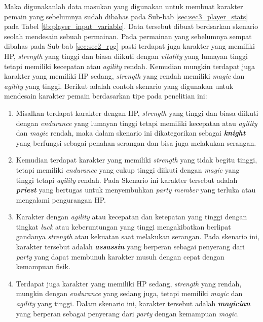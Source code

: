 Maka digunakanlah data masukan yang digunakan untuk membuat karakter pemain yang sebelumnya sudah dibahas pada Sub-bab \ref{sec:sec3_player_stats} pada Tabel \ref{tb:player_input_variable}. Data tersebut dibuat berdsarkan skenario seolah mendesain sebuah permainan. Pada permainan yang sebelumnya sempat dibahas pada Sub-bab \ref{sec:sec2_rpg} pasti terdapat juga karakter yang memiliki HP, \textit{strength} yang tinggi dan biasa diikuti dengan \textit{vitality} yang lumayan tinggi tetapi memiliki kecepatan atau \textit{agility} rendah. Kemudian mungkin terdapat juga karakter yang memiliki HP sedang, \textit{strength} yang rendah memiliki \textit{magic} dan \textit{agility} yang tinggi. Berikut adalah contoh skenario yang digunakan untuk mendesain karakter pemain berdasarkan tipe pada penelitian ini:

\begin{enumerate}[label=\arabic*).]
	\item Misalkan terdapat karakter dengan HP, \textit{strength} yang tinggi dan biasa diikuti dengan \textit{endurance} yang lumayan tinggi tetapi memiliki kecepatan atau \textit{agility} dan \textit{magic} rendah, maka dalam skenario ini dikategorikan sebagai \textbf{\textit{knight}} yang berfungsi sebagai penahan serangan dan bisa juga melakukan serangan. 
	
	\item Kemudian terdapat karakter yang memiliki \textit{strength} yang tidak begitu tinggi, tetapi memiliki \textit{endurance} yang cukup tinggi diikuti dengan \textit{magic} yang tinggi tetapi \textit{agility} rendah. Pada Skenario ini karakter tersebut adalah \textbf{\textit{priest}} yang bertugas untuk menyembuhkan \textit{party member} yang terluka atau mengalami pengurangan HP. 
	
	\item Karakter dengan \textit{agility} atau kecepatan dan ketepatan yang tinggi dengan tingkat \textit{luck} atau keberuntungan yang tinggi mengakibatkan berlipat gandanya \textit{strength} atau kekuatan saat melakukan serangan. Pada skenario ini, karakter tersebut adalah \textbf{\textit{assassin}} yang berperan sebagai penyerang dari \textit{party} yang dapat membunuh karakter musuh dengan cepat dengan kemampuan fisik.
	
	\item Terdapat juga karakter yang memiliki HP sedang, \textit{strength} yang rendah, mungkin dengan \textit{endurance} yang sedang juga, tetapi memiliki \textit{magic} dan \textit{agility} yang tinggi. Dalam skenario ini, karakter tersebut adalah \textbf{\textit{magician}} yang berperan sebagai penyerang dari \textit{party} dengan kemampuan \textit{magic}.
\end{enumerate}


